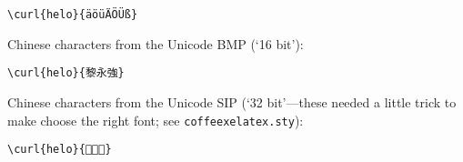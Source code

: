 \begin{verbatim}
\curl{helo}{äöüÄÖÜß}
\end{verbatim}


Chinese characters from the Unicode BMP (`16 bit'):

\begin{verbatim}
\curl{helo}{黎永強}
\end{verbatim}


Chinese characters from the Unicode SIP (`32 bit'---these needed a little trick to make \XeLaTeX choose
the right font; see \verb#coffeexelatex.sty#):

\begin{verbatim}
\curl{helo}{𠀀𠀐𠀙}
\end{verbatim}








